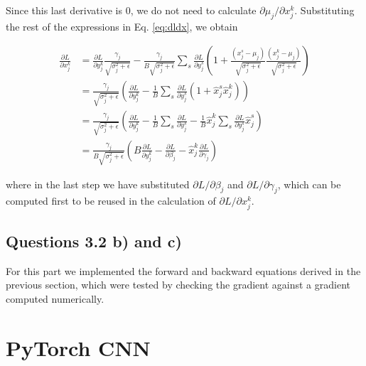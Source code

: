 \documentclass{article}
\newcommand{\pd}[2]{\frac{\partial #1}{\partial #2}}
\begin{document}
Since this last derivative is 0, we do not need to calculate $\partial\mu_j/\partial x_j^k$. Substituting the rest of the expressions in Eq. \ref{eq:dldx}, we obtain

\begin{align*}
\pd{L}{x_j^k} &= \pd{L}{y_j^k}\frac{\gamma_j}{\sqrt{\sigma_j^2 + \epsilon}} -\frac{\gamma_j}{B\sqrt{\sigma_j^2 + \epsilon}}\sum_s \pd{L}{y_j^s}\left(1 + \frac{(x_j^s - \mu_j)}{\sqrt{\sigma_j^2 + \epsilon}}\frac{(x_j^k - \mu_j)}{\sqrt{\sigma_j^2 + \epsilon}}  \right) \\
&=
\frac{\gamma_j}{\sqrt{\sigma_j^2 + \epsilon}}\left(\pd{L}{y_j^k} - \frac{1}{B}\sum_s \pd{L}{y_j^s} (1 + \hat{x}_j^s \hat{x}_j^k) \right) \\
&=
\frac{\gamma_j}{\sqrt{\sigma_j^2 + \epsilon}}\left(\pd{L}{y_j^k} - \frac{1}{B}\sum_s \pd{L}{y_j^s} - \frac{1}{B}\hat{x}_j^k\sum_s \pd{L}{y_j^s}\hat{x}_j^s \right) \\
&=
\frac{\gamma_j}{B\sqrt{\sigma_j^2 + \epsilon}}\left(B\pd{L}{y_j^k} - \pd{L}{\beta_j} - \hat{x}_j^k \pd{L}{\gamma_j} \right)
\end{align*}

where in the last step we have substituted $\partial L/\partial\beta_j$ and $\partial L/\partial\gamma_j$, which can be computed first to be reused in the calculation of $\partial L/\partial x_j^k$.

\subsection*{Questions 3.2 b) and c)}

For this part we implemented the forward and backward equations derived in the previous section, which were tested by checking the gradient against a gradient computed numerically.

\section{PyTorch CNN}




\end{document}
